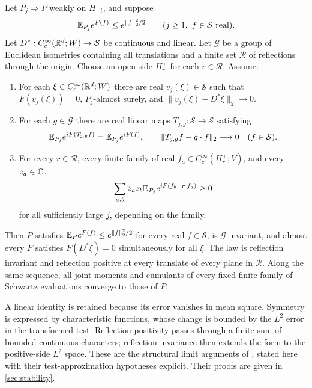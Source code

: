 \begin{theorem}
\label{thm:structural-limit}
Let \(P_j\Rightarrow P\) weakly on \(H_{-t}\), and suppose
\begin{equation}\label{eq:common-gaussian}
 \mathbb E_{P_j}e^{F(f)}\le e^{\|f\|_2^2/2}
 \qquad(j\ge1,\ f\in\mathcal S\text{ real}).
\end{equation}
Let \(D^*:C_c^\infty(\mathbb R^d;W)\to\mathcal S\) be continuous and
linear. Let \(\mathcal G\) be a group of Euclidean isometries
containing all translations and a finite set \(\mathcal R\) of
reflections through the origin. Choose an open side \(H_r^+\) for
each \(r\in\mathcal R\). Assume:
\begin{enumerate}[label=(\roman*),leftmargin=*]
\item\label{hyp:identity}
For each \(\xi\in C_c^\infty(\mathbb R^d;W)\) there are real
\(v_j(\xi)\in\mathcal S\) such that \(F(v_j(\xi))=0\),
\(P_j\)-almost surely, and
\(\|v_j(\xi)-D^*\xi\|_2\to0\).
\item\label{hyp:symmetry}
For each \(g\in\mathcal G\) there are real linear maps
\(T_{j,g}:\mathcal S\to\mathcal S\) satisfying
\[
 \mathbb E_{P_j}e^{iF(T_{j,g}f)}=\mathbb E_{P_j}e^{iF(f)},\qquad
 \|T_{j,g}f-g\cdot f\|_2\longrightarrow0
 \quad(f\in\mathcal S).
\]
\item\label{hyp:reflection}
For every \(r\in\mathcal R\), every finite family of real
\(f_a\in C_c^\infty(H_r^+;V)\), and every \(z_a\in\mathbb C\),
\begin{equation}\label{eq:rp-approx}
 \sum_{a,b}\overline z_a z_b
 \mathbb E_{P_j}e^{iF(f_b-r\cdot f_a)}\ge0
\end{equation}
for all sufficiently large \(j\), depending on the family.
\end{enumerate}
Then \(P\) satisfies \(\mathbb E_Pe^{F(f)}\le e^{\|f\|_2^2/2}\)
for every real \(f\in\mathcal S\), is
\(\mathcal G\)-invariant, and almost every \(F\) satisfies
\(F(D^*\xi)=0\) simultaneously for all \(\xi\).
The law is reflection invariant and reflection positive at every
translate of every plane in \(\mathcal R\).
Along the same sequence, all joint moments and cumulants of every
fixed finite family of Schwartz evaluations converge to those of \(P\).
\end{theorem}

A linear identity is retained because its error vanishes in mean
square. Symmetry is expressed by characteristic functions, whose
change is bounded by the \(L^2\) error in the transformed test.
Reflection positivity passes through a finite sum of bounded
continuous characters; reflection invariance then extends the form
to the positive-side \(L^2\) space. These are the structural limit
arguments of \cite[Sections~6.3 and~6.5]{QED3Manuscript}, stated
here with their test-approximation hypotheses explicit. Their proofs
are given in \cref{sec:stability}.

